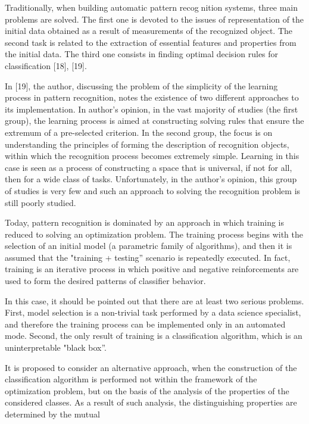 \documentclass[10pt, a4paper]{article}
\begin{document}
\begin{multicols}{2}
Traditionally, when building automatic pattern recognition systems, three main problems are solved. The
first one is devoted to the issues of representation of
the initial data obtained as a result of measurements of
the recognized object. The second task is related to the
extraction of essential features and properties from the
initial data. The third one consists in finding optimal
decision rules for classification [18], [19].
\par
In [19], the author, discussing the problem of the
simplicity of the learning process in pattern recognition,
notes the existence of two different approaches to its
implementation. In author’s opinion, in the vast majority
of studies (the first group), the learning process is aimed
at constructing solving rules that ensure the extremum
of a pre-selected criterion. In the second group, the
focus is on understanding the principles of forming
the description of recognition objects, within which the
recognition process becomes extremely simple. Learning
in this case is seen as a process of constructing a space
that is universal, if not for all, then for a wide class of
tasks. Unfortunately, in the author’s opinion, this group
of studies is very few and such an approach to solving
the recognition problem is still poorly studied.
\par
Today, pattern recognition is dominated by an approach in which training is reduced to solving an optimization problem. The training process begins with
the selection of an initial model (a parametric family of
algorithms), and then it is assumed that the "training +
testing” scenario is repeatedly executed. In fact, training
is an iterative process in which positive and negative
reinforcements are used to form the desired patterns of
classifier behavior.
\par
In this case, it should be pointed out that there are
at least two serious problems. First, model selection is a
non-trivial task performed by a data science specialist,
and therefore the training process can be implemented
only in an automated mode. Second, the only result
of training is a classification algorithm, which is an
uninterpretable "black box”.
\par
It is proposed to consider an alternative approach,
when the construction of the classification algorithm is
performed not within the framework of the optimization
problem, but on the basis of the analysis of the properties
of the considered classes. As a result of such analysis, the
distinguishing properties are determined by the mutual

\end{multicols}
\end{document}
